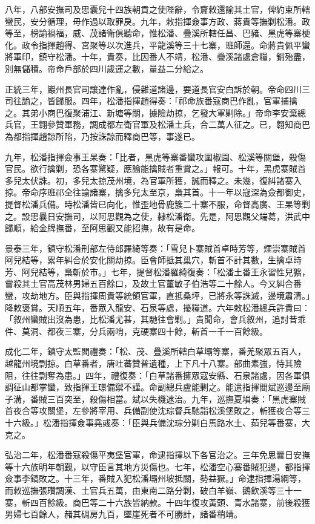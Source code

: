 \begin{pinyinscope}
八年，八部安撫司及思囊兒十四族朝貢之使陛辭，令齎敕還諭其土官，俾約束所轄蠻民，安分循理，毋作過以取罪戾。九年，敕指揮僉事方政、蔣貴等撫剿松潘。政等至，榜諭禍福，威、茂諸衛俱聽命，惟松潘、疊溪所轄任昌、巴豬、黑虎等寨梗化。政令指揮趙得、宮聚等以次進兵，平龍溪等三十七寨，班師還。命蔣貴佩平蠻將軍印，鎮守松潘。十年，貴奏，比因番人不靖，松潘、疊溪諸處倉糧，銷殆盡，別無儲積。帝命戶部於四川歲運之數，量益二分給之。

正統三年，巖州長官司讓達作亂，侵雜道諸邊，要道長官安白訴於朝。帝命四川三司往諭之，皆歸服。四年，松潘指揮趙得奏：「祁命族番寇商巴作亂，官軍捕擒之。其弟小商巴復聚浦江、新塘等關，據險劫掠，乞發大軍剿除。」帝命李安棄總兵官，王翱參贊軍務，調成都左衛官軍及松潘土兵，合二萬人征之。已，翱知商巴為都指揮趙諒所陷，乃按誅諒而釋商巴等，事遂已。

九年，松潘指揮僉事王杲奏：「比者，黑虎等寨番蠻攻圍椒園、松溪等關堡，殺傷官民。欲行擒剿，恐各寨驚疑，應諭能擒賊者重賞之。」報可。十年，黑虎寨賊首多兒太伏誅。初，多兒太掠茂州境，為官軍所獲，誠而釋之。未幾，復糾諸寨入掠。帝命序班祁全往諭諸寨，擒多兒太至京，梟其首。十一年以寇深為僉都御史，提督松潘兵備。時松潘皆已向化，惟歪地骨鹿簇二十寨不服，命督高廣、王杲等剿之。設思曩日安撫司，以阿思觀為之使，隸松潘衛。先是，阿思觀父端葛，洪武中歸順，給金牌撫番，至阿思觀又能招撫，故有是命。

景泰三年，鎮守松潘刑部左侍郎羅綺等奏：「雪兒卜寨賊首卓時芳等，煙崇寨賊首阿兒結等，累年糾合於安化關劫掠。臣會師抵其巢穴，斬首不計其數，生擒卓時芳、阿兒結等，梟斬於市。」七年，提督松潘羅綺復奏：「松潘土番王永習性兒獷，嘗殺其土官高茂林男婦五百餘口，及故土官董敏子伯浩等二十餘人。今又糾合番蠻，攻劫地方。臣與指揮周貴等統領官軍，直抵桑坪，已將永等誅滅，邊境肅清。」降敕褒賞。天順五年，番眾入龍安、石泉等處，擾糧道。六年敕松潘總兵許貴曰：「敘州蠻賊出沒為患，比松潘尤甚，其馳往會剿。」貴聞命，會兵敘州，追討昔乖件、莫洞、都夜三寨，分兵兩哨，克硬寨四十餘，斬首一千一百餘級。

成化二年，鎮守太監閻禮奏：「松、茂、疊溪所轄白草壩等寨，番羌聚眾五百人，越龍州境剽掠。白草番者，唐吐蕃贊普遺種，上下凡十八寨。部曲素強，恃其險阻，往往剽奪為患。」四年，禮復奏：「白草諸番擁眾寇安縣、石泉諸處，因各軍俱調征山都掌蠻，致指揮王璟備禦不謹。命副總兵盧能剿之。能遣指揮閻斌巡邊至廟子溝，番賊三百突至，殺傷相當。斌以失機逮治。九年，巡撫夏塤奏：「黑虎寨賊首夜合等攻關堡，左參將宰用、兵備副使沈琮督兵馳詣松溪堡敗之，斬獲夜合等三十六級。」松潘指揮僉事堯彧奏：「臣與兵備沈琮分剿白馬路水土、茹兒等番寨，大克之。

弘治二年，松潘番寇殺傷平夷堡官軍，命逮指揮以下各官治之。三年免思曩日安撫等十六族明年朝覲，以守臣言其地方災傷也。七年，松潘空心寨番賊犯邊，都指揮僉事李鎬敗之。十三年，番賊入犯松潘壩州坡抵關，勢益獗。」命逮指揮湯綱等，而敕巡撫張瓚調漢、土官兵五萬，由東南二路分剿，破白羊嶺、鵝飲溪等三十一寨，斬四百餘級。商巴等二十六族皆納款。十四年復攻黃頭、青水諸寨，前後殺獲男婦七百餘人，赭其碉房九百，墜崖死者不可勝計，諸番稍靖。


\end{pinyinscope}
